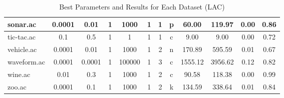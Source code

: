 \begin{table}[htbp]
{\begin{tabular}{|l|c|c|c|c|c|c|c||c|c|c|c|}
		\hline
		sonar.ac       & 0.0001   & 0.01        & 1              & 1000                & 1             & 1      & p             & 60.00          & 119.97         & 0.00           & 0.86           \\
		\hline
		tic-tac.ac     & 0.1      & 0.5         & 1              & 1                   & 1             & 1      & c             & 9.00           & 9.00           & 0.00           & 0.72           \\
		\hline
		vehicle.ac     & 0.0001   & 0.01        & 1              & 1000                & 1             & 2      & n             & 170.89         & 595.59         & 0.01           & 0.67           \\
		\hline
		waveform.ac    & 0.0001   & 0.0001      & 1              & 100000              & 1             & 3      & c             & 1555.12        & 3956.62        & 0.12           & 0.82           \\
		\hline
		wine.ac        & 0.01     & 0.3         & 1              & 1000                & 1             & 2      & c             & 90.58          & 118.38         & 0.00           & 0.99           \\
		\hline
		zoo.ac         & 0.0001   & 0.1         & 1              & 1000                & 1             & 2      & k             & 134.59         & 338.64         & 0.01           & 0.84           \\
		\hline
		\end{tabular}
		}
	\caption{Best Parameters and Results for Each Dataset (LAC)}
	\label{tab:best_runs_for_each_db_lac}
\end{table}